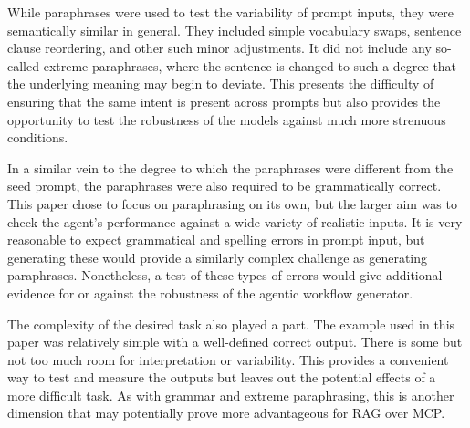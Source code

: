 While paraphrases were used to test the variability of prompt inputs, they were semantically
similar in general. They included simple vocabulary swaps, sentence clause reordering, and other
such minor adjustments. It did not include any so-called extreme paraphrases, where the sentence
is changed to such a degree that the underlying meaning may begin to deviate. This presents the
difficulty of ensuring that the same intent is present across prompts but also provides the
opportunity to test the robustness of the models against much more strenuous conditions.

In a similar vein to the degree to which the paraphrases were different from the seed prompt, the
paraphrases were also required to be grammatically correct. This paper chose to focus on
paraphrasing on its own, but the larger aim was to check the agent's performance against a wide
variety of realistic inputs. It is very reasonable to expect grammatical and spelling errors in
prompt input, but generating these would provide a similarly complex challenge as generating
paraphrases. Nonetheless, a test of these types of errors would give additional evidence for or
against the robustness of the agentic workflow generator.

The complexity of the desired task also played a part. The example used in this paper was
relatively simple with a well-defined correct output. There is some but not too much room for
interpretation or variability. This provides a convenient way to test and measure the outputs but
leaves out the potential effects of a more difficult task. As with grammar and extreme
paraphrasing, this is another dimension that may potentially prove more advantageous for RAG over
MCP.
